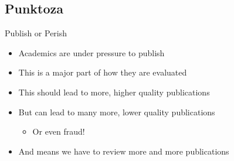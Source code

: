 \documentclass[aspectratio=169]{beamer}
\begin{document}
\subsection{Punktoza}
\begin{frame}{Publish or Perish}

  \begin{itemize}
  \item Academics are under pressure to publish
  \item This is a major part of how they are evaluated
  \item This should lead to more, higher quality publications
  \item But can lead to many more, lower  quality publications
    \begin{itemize}
    \item Or even fraud!
    \end{itemize}
  \item And means we have to review more and more publications
  \end{itemize}

\end{frame}
\end{document}
